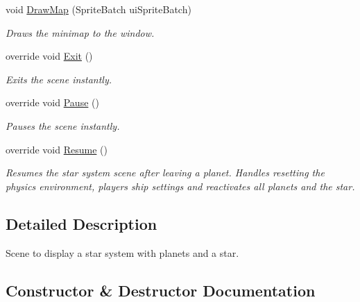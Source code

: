 \begin{DoxyCompactItemize}
void \hyperlink{class_midnight_blue_1_1_star_system_scene_a8ce5e552f65d43e0326644e069dc6c24}{Draw\+Map} (Sprite\+Batch ui\+Sprite\+Batch)
\begin{DoxyCompactList}\small\item\em Draws the minimap to the window. \end{DoxyCompactList}\item 
override void \hyperlink{class_midnight_blue_1_1_star_system_scene_ad533ba93e597964d015099031a85cb77}{Exit} ()
\begin{DoxyCompactList}\small\item\em Exits the scene instantly. \end{DoxyCompactList}\item 
override void \hyperlink{class_midnight_blue_1_1_star_system_scene_a04e8bfcb31eebfd859c4bd543f0bb6f9}{Pause} ()
\begin{DoxyCompactList}\small\item\em Pauses the scene instantly. \end{DoxyCompactList}\item 
override void \hyperlink{class_midnight_blue_1_1_star_system_scene_aefbf0750a7ce153b923bcabb132e4875}{Resume} ()
\begin{DoxyCompactList}\small\item\em Resumes the star system scene after leaving a planet. Handles resetting the physics environment, players ship settings and reactivates all planets and the star. \end{DoxyCompactList}\end{DoxyCompactItemize}


\subsection{Detailed Description}
Scene to display a star system with planets and a star. 



\subsection{Constructor \& Destructor Documentation}
\hypertarget{class_midnight_blue_1_1_star_system_scene_a630b2de039b719d35fbdf572bbc69ea0}{}\label{class_midnight_blue_1_1_star_system_scene_a630b2de039b719d35fbdf572bbc69ea0} 
